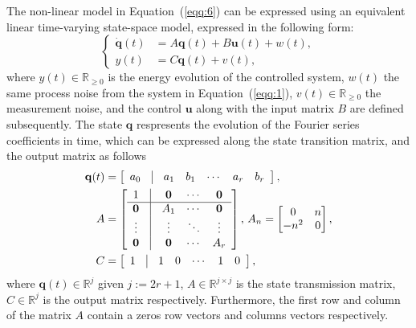 \documentclass[letterpaper,10pt,conference]{ieeeconf}
\begin{document}
The non-linear model in Equation~(\ref{eqq:6}) can be expressed using an equivalent linear time-varying state-space model, expressed in the following form:
\begin{equation}\label{eqq:7}\begin{cases}
  \dot{\mathbf{q}}(t)&=A\mathbf{q}(t)+B\mathbf{u}(t)+w(t),\\
  y(t)&=C\mathbf{q}(t)+v(t),
\end{cases}\end{equation}
where $y(t)\in\mathbb{R}_{\geq 0}$ is the energy evolution of the controlled system, $w(t)$ the same process noise from the system in Equation~(\ref{eqq:1}), $v(t)\in\mathbb{R}_{\geq 0}$ the measurement noise, and the control $\mathbf{u}$ along with the input matrix $B$ are defined subsequently. The state $\mathbf{q}$ respresents the evolution of the Fourier series coefficients in time, which can be expressed along the state transition matrix, and the output matrix as follows
\begin{equation}\begin{split}
  \mathbf{q}(t)&=\left[\begin{array}{ccccccc}
    a_0 & \vline & a_1 & b_1 & \cdots & a_r & b_r
  \end{array}\right],\\
  A&=\left[\begin{array}{ccccc}
    1          & \vline & \mathbf{0} & \cdots & \mathbf{0} \\\hline
    \mathbf{0} & \vline & A_1        & \cdots & \mathbf{0} \\
    \vdots     & \vline & \vdots     & \ddots & \vdots     \\
    \mathbf{0} & \vline & \mathbf{0} & \cdots & A_r 
  \end{array}\right],\,A_n=\begin{bmatrix}0 & n \\ -n^2 & 0\end{bmatrix},\\
  C&=\left[\begin{array}{ccccccc}
    1 & \vline & 1 & 0 & \cdots & 1 & 0
  \end{array}\right],
\end{split}\end{equation}
where $\mathbf{q}(t)\in\mathbb{R}^j$ given $j:=2r+1$, $A\in\mathbb{R}^{j\times j}$ is the state transmission matrix, $C\in\mathbb{R}^j$ is the output matrix respectively. Furthermore, the first row and column of the matrix $A$ contain a zeros row vectors and columns vectors respectively.
\end{document}
